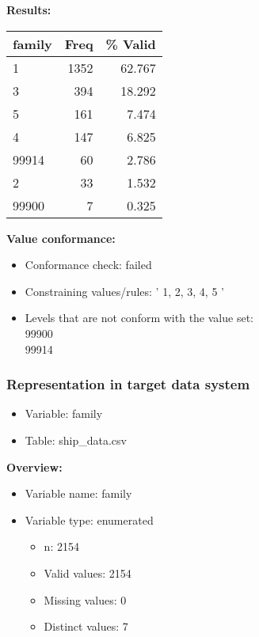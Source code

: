 \documentclass[
]{article}
\providecommand{\tightlist}{%
  \setlength{\itemsep}{0pt}\setlength{\parskip}{0pt}}
\begin{document}
\textbf{Results:}\\

\begin{table}[H]
\centering
\begin{tabular}{l|r|r}
\hline
\textbf{family} & \textbf{Freq} & \textbf{\% Valid}\\
\hline
1 & 1352 & 62.767\\
\hline
3 & 394 & 18.292\\
\hline
5 & 161 & 7.474\\
\hline
4 & 147 & 6.825\\
\hline
99914 & 60 & 2.786\\
\hline
2 & 33 & 1.532\\
\hline
99900 & 7 & 0.325\\
\hline
\end{tabular}
\end{table}

\textbf{Value conformance:}

\begin{itemize}
\tightlist
\item
  Conformance check: failed
\item
  Constraining values/rules: ' 1, 2, 3, 4, 5 '
\item
  Levels that are not conform with the value set:\\
  99900\\
  99914
\end{itemize}

\newpage

\hypertarget{representation-in-target-data-system-11}{%
\subsubsection{\texorpdfstring{Representation in \textbf{target} data
system}{Representation in target data system}}\label{representation-in-target-data-system-11}}

\begin{itemize}
\tightlist
\item
  Variable: family
\item
  Table: ship\_data.csv
\end{itemize}

\textbf{Overview:}

\begin{itemize}
\tightlist
\item
  Variable name: family
\item
  Variable type: enumerated

  \begin{itemize}
  \tightlist
  \item
    n: 2154
  \item
    Valid values: 2154
  \item
    Missing values: 0
  \item
    Distinct values: 7
  \end{itemize}
\end{itemize}
\end{document}
